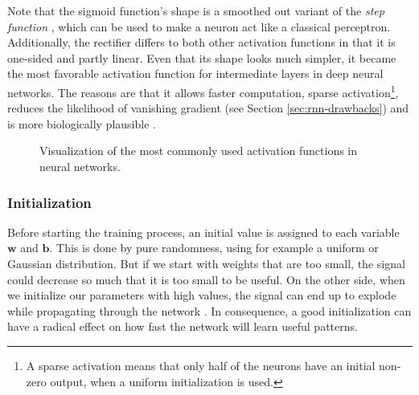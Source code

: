 Note that the sigmoid function's shape is a smoothed out variant of the \textit{step function} \parencite{neural_nets_deep_learning}, which can be used to make a neuron act like a classical perceptron. Additionally, the rectifier differs to both other activation functions in that it is one-sided and partly linear. Even that its shape looks much simpler, it became the most favorable activation function for intermediate layers in deep neural networks. The reasons are that it allows faster computation, sparse activation\footnote{{A sparse activation means that only half of the neurons have an initial non-zero output, when a uniform initialization is used.}}, reduces the likelihood of vanishing gradient (see Section \ref{sec:rnn-drawbacks}) and is more biologically plausible \parencite{relu}.

\begin{figure}[htpb]
  \centering
  \caption[Activation functions]{Visualization of the most commonly used activation functions in neural networks.}\label{fig:activations}
\end{figure}

\subsubsection{Initialization}

Before starting the training process, an initial value is assigned to each variable $ \textbf{w} $ and $ \textbf{b} $. This is done by pure randomness, using for example a uniform or Gaussian distribution. But if we start with weights that are too small, the signal could decrease so much that it is too small to be useful. On the other side, when we initialize our parameters with high values, the signal can end up to explode while propagating through the network \parencite{understand_xavier}. In consequence, a good initialization can have a radical effect on how fast the network will learn useful patterns.

